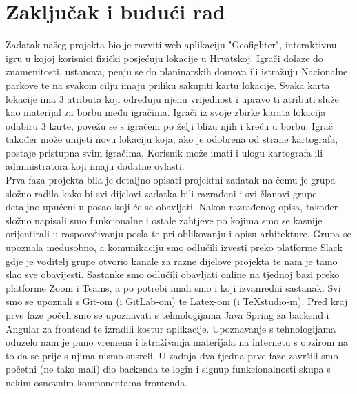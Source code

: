 \chapter{Zaključak i budući rad}
		
		\textnormal{Zadatak našeg projekta bio je razviti web aplikaciju "Geofighter", interaktivnu igru u kojoj korisnici fizički posjećuju lokacije u Hrvatskoj. Igrači dolaze do znamenitosti, ustanova, penju se do planinarskih domova ili istražuju Nacionalne parkove te na svakom cilju imaju priliku sakupiti kartu lokacije. Svaka karta lokacije ima 3 atributa koji određuju njenu vrijednost i upravo ti atributi služe kao materijal za borbu među igračima. Igrači iz svoje zbirke karata lokacija odabiru 3 karte, povežu se s igračem po želji blizu njih i kreću u borbu. Igrač također može unijeti novu lokaciju koja, ako je odobrena od strane kartografa, postaje pristupna svim igračima. Korisnik može imati i ulogu kartografa ili administratora koji imaju dodatne ovlasti.}\\
		 
		 \textnormal{Prva faza projekta bila je detaljno opisati projektni zadatak na čemu je grupa složno radila kako bi svi dijelovi zadatka bili razrađeni i svi članovi grupe detaljno upućeni u posao koji će se obavljati. Nakon razrađenog opisa, također složno napisali smo funkcionalne i ostale zahtjeve po kojima smo se kasnije orijentirali u raspoređivanju posla te pri oblikovanju i opisu arhitekture. Grupa se upoznala međusobno, a komunikaciju smo odlučili izvesti preko platforme Slack gdje je voditelj grupe otvorio kanale za razne dijelove projekta te nam je tamo slao sve obavijesti. Sastanke smo odlučili obavljati online na tjednoj bazi preko platforme Zoom i Teams, a po potrebi imali smo i koji izvanredni sastanak. Svi smo se upoznali s Git-om (i GitLab-om) te Latex-om (i TeXstudio-m). Pred kraj prve faze počeli smo se upoznavati s tehnologijama Java Spring za backend i Angular za frontend te izradili kostur aplikacije. Upoznavanje s tehnologijama oduzelo nam je puno vremena i istraživanja materijala na internetu s obzirom na to da se prije s njima nismo susreli. U zadnja dva tjedna prve faze završili smo početni (ne tako mali) dio backenda te login i signup funkcionalnosti skupa s nekim osnovnim komponentama frontenda.}\\
		 
